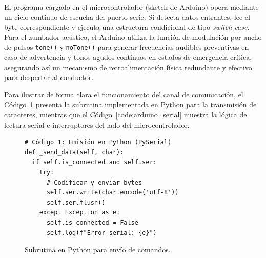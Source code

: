 \documentclass[conference]{IEEEtran}
\begin{document}
\begin{table}[htbp]
\caption{Mapeo de pines y comandos en el microcontrolador Arduino}
\label{tab:mapeo_pines_arduino}
\centering
{}
\end{table}

El programa cargado en el microcontrolador (sketch de Arduino) opera mediante un ciclo continuo de escucha del puerto serie. Si detecta datos entrantes, lee el byte correspondiente y ejecuta una estructura condicional de tipo \textit{switch-case}. Para el zumbador acústico, el Arduino utiliza la función de modulación por ancho de pulsos \texttt{tone()} y \texttt{noTone()} para generar frecuencias audibles preventivas en caso de advertencia y tonos agudos continuos en estados de emergencia crítica, asegurando así un mecanismo de retroalimentación física redundante y efectivo para despertar al conductor.

Para ilustrar de forma clara el funcionamiento del canal de comunicación, el Código~\ref{code:python_serial} presenta la subrutina implementada en Python para la transmisión de caracteres, mientras que el Código~\ref{code:arduino_serial} muestra la lógica de lectura serial e interruptores del lado del microcontrolador.

\begin{figure}[H]
\centering
\begin{minipage}{\columnwidth}
\scriptsize
\begin{verbatim}
# Código 1: Emisión en Python (PySerial)
def _send_data(self, char):
  if self.is_connected and self.ser:
    try:
      # Codificar y enviar bytes
      self.ser.write(char.encode('utf-8'))
      self.ser.flush()
    except Exception as e:
      self.is_connected = False
      self.log(f"Error serial: {e}")
\end{verbatim}
\end{minipage}
\caption{Subrutina en Python para envío de comandos.}
\label{code:python_serial}
\end{figure}
\end{document}
